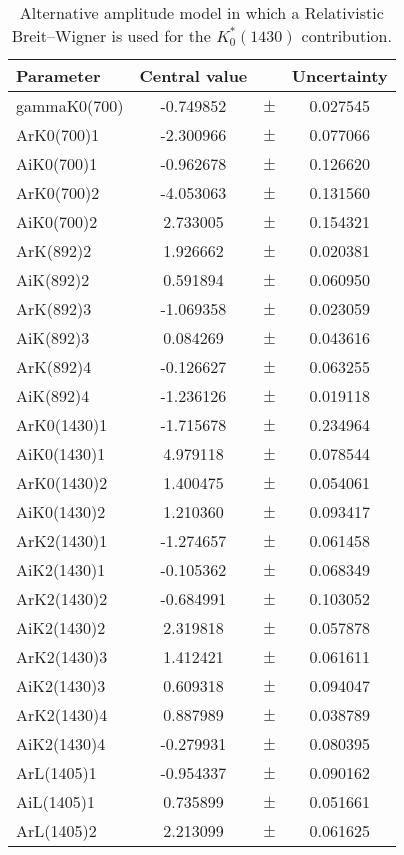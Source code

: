 \clearpage

\begin{table}
\centering
\caption{Alternative amplitude model in which a Relativistic Breit--Wigner is used for the $K^*_0(1430)$ contribution.}
\begin{tiny}
\begin{tabular}{lccc}
\toprule
Parameter & Central value & & Uncertainty\\
\midrule 
gammaK0(700) & -0.749852 & $\pm$ & 0.027545 \\
ArK0(700)1 & -2.300966 & $\pm$ & 0.077066 \\
AiK0(700)1 & -0.962678 & $\pm$ & 0.126620 \\
ArK0(700)2 & -4.053063 & $\pm$ & 0.131560 \\
AiK0(700)2 & 2.733005 & $\pm$ & 0.154321 \\
ArK(892)2 & 1.926662 & $\pm$ & 0.020381 \\
AiK(892)2 & 0.591894 & $\pm$ & 0.060950 \\
ArK(892)3 & -1.069358 & $\pm$ & 0.023059 \\
AiK(892)3 & 0.084269 & $\pm$ & 0.043616 \\
ArK(892)4 & -0.126627 & $\pm$ & 0.063255 \\
AiK(892)4 & -1.236126 & $\pm$ & 0.019118 \\
ArK0(1430)1 & -1.715678 & $\pm$ & 0.234964 \\
AiK0(1430)1 & 4.979118 & $\pm$ & 0.078544 \\
ArK0(1430)2 & 1.400475 & $\pm$ & 0.054061 \\
AiK0(1430)2 & 1.210360 & $\pm$ & 0.093417 \\
ArK2(1430)1 & -1.274657 & $\pm$ & 0.061458 \\
AiK2(1430)1 & -0.105362 & $\pm$ & 0.068349 \\
ArK2(1430)2 & -0.684991 & $\pm$ & 0.103052 \\
AiK2(1430)2 & 2.319818 & $\pm$ & 0.057878 \\
ArK2(1430)3 & 1.412421 & $\pm$ & 0.061611 \\
AiK2(1430)3 & 0.609318 & $\pm$ & 0.094047 \\
ArK2(1430)4 & 0.887989 & $\pm$ & 0.038789 \\
AiK2(1430)4 & -0.279931 & $\pm$ & 0.080395 \\
ArL(1405)1 & -0.954337 & $\pm$ & 0.090162 \\
AiL(1405)1 & 0.735899 & $\pm$ & 0.051661 \\
ArL(1405)2 & 2.213099 & $\pm$ & 0.061625 \\

\end{tabular}
\end{tiny}
\end{table}
